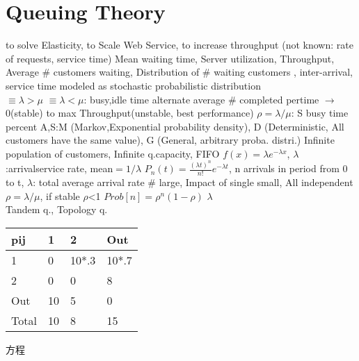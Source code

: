 \section{Queuing Theory}
to solve Elasticity, 
to Scale Web Service, 
to increase throughput
(not known: rate of requests, service time)
Mean waiting time,
Server utilization,
Throughput,
Average \# customers waiting,
Distribution of \# waiting customers
,
inter-arrival, service time modeled as stochastic probabilistic distribution
%
%
%
\\
$\equiv \lambda > \mu$
$\equiv \lambda < \mu$:
busy,idle time alternate
average \# completed pertime
$\rightarrow$
0(stable) to max Throughput(unstable, best performance) 
$\rho= \lambda / \mu$:
S busy time percent
A,S:M (Markov,Exponential probability density),
D (Deterministic, All customers have the same value),
G (General, arbitrary proba. distri.)
Infinite population of customers, Infinite q.capacity, FIFO
$f(x)=\lambda e^{-\lambda x}$,
$\lambda$:arrivalservice rate,
mean$= 1/\lambda$
$P_n(t) = \frac{(\lambda t)^n}{n!}e^{-\lambda t}$,
n arrivals in period from 0 to t,
$\lambda$: total average arrival rate
\# large,
Impact of single small,
All independent
\\
$\rho = \lambda/\mu$, if stable $\rho$<1
$Prob[n] =\rho^n(1-\rho)$
$\lambda$
\\
Tandem q.,
Topology q.
\begin{tabular}{|l|l|l|l|}
  \hline			
  pij   & 1   & 2       & Out \\
  \hline
  1     & 0   & 10*.3   & 10*.7\\
  2     & 0   & 0       & 8 \\
  Out   & 10  & 5       & 0\\
  \hline
  Total & 10  & 8       & 15 \\
  \hline  
\end{tabular}
\begin{CJK*}{UTF8}{gbsn}方程\end{CJK*}
